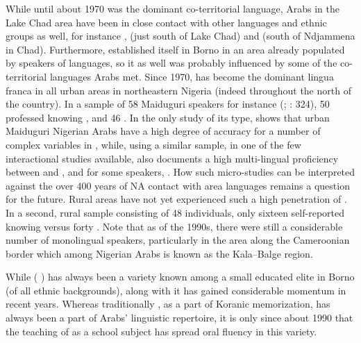 \documentclass[output=paper]{langsci/langscibook}
\begin{document}
While until about 1970  was the dominant co-territorial language, Arabs in the {Lake Chad} area have been in close contact with other languages and ethnic groups as well, for instance ,  (just south of {Lake Chad}) and  (south of Ndjammena in Chad). Furthermore,  established itself in {Borno} in an area already populated by speakers of  languages, so it as well was probably influenced by some of the co-territorial languages Arabs met. Since 1970,  has become the dominant lingua franca in all urban areas in northeastern Nigeria (indeed throughout the north of the country). In a sample of 58 Maiduguri speakers for instance (\citealt{Owens1998}; \citealt{Owens2000article}: 324), 50 professed knowing , and 46 . In the only study of its type, \citet{Broß2007} shows that urban Maiduguri Nigerian Arabs have a high degree of accuracy for a number of complex variables in , while, using a similar sample, in one of the few interactional studies available, \citet{Owens2002} also documents a high multi-lingual proficiency between  and , and for some speakers, . How such micro-studies can be interpreted against the over 400 years of NA contact with area languages remains a question for the {future}. Rural areas have not yet experienced such a high penetration of . In a second, rural sample consisting of 48 individuals, only sixteen self-reported knowing  versus forty . Note that as of the 1990s, there were still a considerable number of {monolingual}  speakers, particularly in the area along the Cameroonian border which among Nigerian Arabs is known as the Kala--Balge region.

While   ( ) has always been a variety known among a small educated elite in {Borno} (of all ethnic backgrounds), along with  it has gained considerable momentum in recent years. Whereas traditionally  , as a part of Koranic memorization, has always been a part of Arabs’ linguistic repertoire, it is only since about 1990 that the teaching of   as a school subject has spread oral fluency in this variety.
\end{document}
